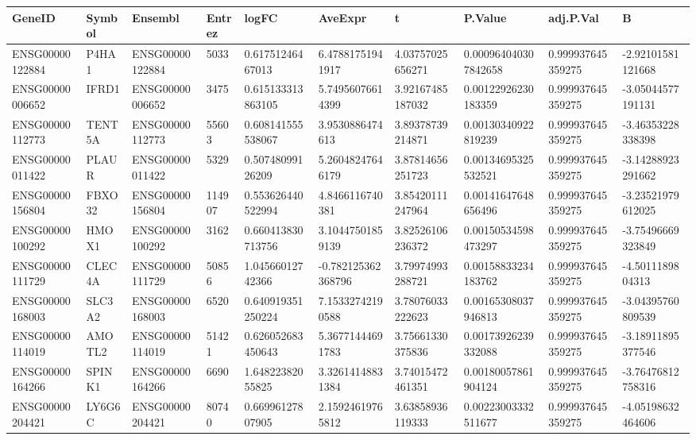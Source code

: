 \begingroup
\tiny
\setlength{\tabcolsep}{2pt}
\renewcommand{\arraystretch}{1.18}
\begin{tabular}{@{}llllllllll@{}}
\toprule
GeneID & Symbol & Ensembl & Entrez & logFC & AveExpr & t & P.Value & adj.P.Val & B \\
\midrule
ENSG00000122884 & P4HA1 & ENSG00000122884 & 5033 & 0.61751246467013 & 6.47881751941917 & 4.03757025656271 & 0.000964040307842658 & 0.999937645359275 & -2.92101581121668 \\
ENSG00000006652 & IFRD1 & ENSG00000006652 & 3475 & 0.615133313863105 & 5.74956076614399 & 3.92167485187032 & 0.00122926230183359 & 0.999937645359275 & -3.05044577191131 \\
ENSG00000112773 & TENT5A & ENSG00000112773 & 55603 & 0.608141555538067 & 3.9530886474613 & 3.89378739214871 & 0.00130340922819239 & 0.999937645359275 & -3.46353228338398 \\
ENSG00000011422 & PLAUR & ENSG00000011422 & 5329 & 0.50748099126209 & 5.26048247646179 & 3.87814656251723 & 0.00134695325532521 & 0.999937645359275 & -3.14288923291662 \\
ENSG00000156804 & FBXO32 & ENSG00000156804 & 114907 & 0.553626440522994 & 4.8466116740381 & 3.85420111247964 & 0.00141647648656496 & 0.999937645359275 & -3.23521979612025 \\
ENSG00000100292 & HMOX1 & ENSG00000100292 & 3162 & 0.660413830713756 & 3.10447501859139 & 3.82526106236372 & 0.00150534598473297 & 0.999937645359275 & -3.75496669323849 \\
ENSG00000111729 & CLEC4A & ENSG00000111729 & 50856 & 1.04566012742366 & -0.782125362368796 & 3.79974993288721 & 0.00158833234183762 & 0.999937645359275 & -4.5011189804313 \\
ENSG00000168003 & SLC3A2 & ENSG00000168003 & 6520 & 0.640919351250224 & 7.15332742190588 & 3.78076033222623 & 0.00165308037946813 & 0.999937645359275 & -3.04395760809539 \\
ENSG00000114019 & AMOTL2 & ENSG00000114019 & 51421 & 0.626052683450643 & 5.36771444691783 & 3.75661330375836 & 0.00173926239332088 & 0.999937645359275 & -3.18911895377546 \\
ENSG00000164266 & SPINK1 & ENSG00000164266 & 6690 & 1.64822382055825 & 3.32614148831384 & 3.74015472461351 & 0.00180057861904124 & 0.999937645359275 & -3.76476812758316 \\
ENSG00000204421 & LY6G6C & ENSG00000204421 & 80740 & 0.66996127807905 & 2.15924619765812 & 3.63858936119333 & 0.00223003332511677 & 0.999937645359275 & -4.05198632464606 \\

\end{tabular}
